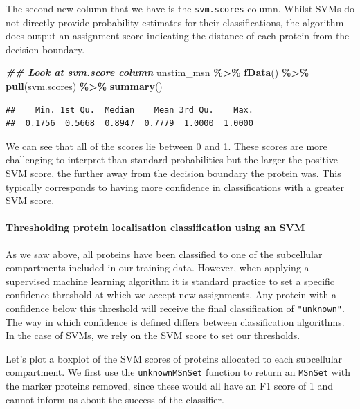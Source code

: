 \documentclass[9pt,a4paper,]{extarticle}
\newenvironment{Shaded}{\begin{snugshade}}{\end{snugshade}}
\newcommand{\DocumentationTok}[1]{\textcolor[rgb]{0.56,0.35,0.01}{\textbf{\textit{#1}}}}
\newcommand{\FunctionTok}[1]{\textcolor[rgb]{0.13,0.29,0.53}{\textbf{#1}}}
\newcommand{\NormalTok}[1]{#1}
\newcommand{\SpecialCharTok}[1]{\textcolor[rgb]{0.81,0.36,0.00}{\textbf{#1}}}
\begin{document}
The second new column that we have is the \texttt{svm.scores} column. Whilst SVMs do
not directly provide probability estimates for their classifications, the
algorithm does output an assignment score indicating the distance of each protein
from the decision boundary.

\begin{Shaded}
\begin{Highlighting}[]
\DocumentationTok{\#\# Look at svm.score column}
\NormalTok{unstim\_msn }\SpecialCharTok{\%\textgreater{}\%}
  \FunctionTok{fData}\NormalTok{() }\SpecialCharTok{\%\textgreater{}\%}
  \FunctionTok{pull}\NormalTok{(svm.scores) }\SpecialCharTok{\%\textgreater{}\%}
  \FunctionTok{summary}\NormalTok{()}
\end{Highlighting}
\end{Shaded}

\begin{verbatim}
##    Min. 1st Qu.  Median    Mean 3rd Qu.    Max. 
##  0.1756  0.5668  0.8947  0.7779  1.0000  1.0000
\end{verbatim}

We can see that all of the scores lie between 0 and 1. These scores are more
challenging to interpret than standard probabilities but the larger the positive
SVM score, the further away from the decision boundary the protein was. This
typically corresponds to having more confidence in classifications with a
greater SVM score.

\paragraph{Thresholding protein localisation classification using an SVM}\label{thresholding-protein-localisation-classification-using-an-svm}

As we saw above, all proteins have been classified to one of the subcellular
compartments included in our training data. However, when applying a supervised
machine learning algorithm it is standard practice to set a specific confidence
threshold at which we accept new assignments. Any protein with a confidence below
this threshold will receive the final classification of \texttt{"unknown"}. The way in
which confidence is defined differs between classification algorithms. In the
case of SVMs, we rely on the SVM score to set our thresholds.

Let's plot a boxplot of the SVM scores of proteins allocated to each subcellular
compartment. We first use the \texttt{unknownMSnSet} function to return an \texttt{MSnSet} with
the marker proteins removed, since these would all have an F1 score of 1 and
cannot inform us about the success of the classifier.
\end{document}
